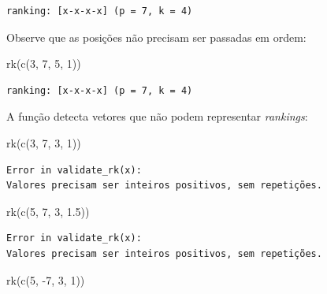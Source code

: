 \documentclass[
  letterpaper,
  DIV=11,
  numbers=noendperiod]{scrreprt}
\newenvironment{Shaded}{\begin{snugshade}}{\end{snugshade}}
\newcommand{\DecValTok}[1]{\textcolor[rgb]{0.68,0.00,0.00}{#1}}
\newcommand{\FloatTok}[1]{\textcolor[rgb]{0.68,0.00,0.00}{#1}}
\newcommand{\FunctionTok}[1]{\textcolor[rgb]{0.28,0.35,0.67}{#1}}
\newcommand{\NormalTok}[1]{\textcolor[rgb]{0.00,0.23,0.31}{#1}}
\newcommand{\SpecialCharTok}[1]{\textcolor[rgb]{0.37,0.37,0.37}{#1}}
\begin{document}
\begin{verbatim}
ranking: [x-x-x-x] (p = 7, k = 4)
\end{verbatim}

Observe que as posições não precisam ser passadas em ordem:

\begin{Shaded}
\begin{Highlighting}[]
\FunctionTok{rk}\NormalTok{(}\FunctionTok{c}\NormalTok{(}\DecValTok{3}\NormalTok{, }\DecValTok{7}\NormalTok{, }\DecValTok{5}\NormalTok{, }\DecValTok{1}\NormalTok{))}
\end{Highlighting}
\end{Shaded}

\begin{verbatim}
ranking: [x-x-x-x] (p = 7, k = 4)
\end{verbatim}

A função detecta vetores que não podem representar \emph{rankings}:

\begin{Shaded}
\begin{Highlighting}[]
\FunctionTok{rk}\NormalTok{(}\FunctionTok{c}\NormalTok{(}\DecValTok{3}\NormalTok{, }\DecValTok{7}\NormalTok{, }\DecValTok{3}\NormalTok{, }\DecValTok{1}\NormalTok{))}
\end{Highlighting}
\end{Shaded}

\begin{verbatim}
Error in validate_rk(x): 
Valores precisam ser inteiros positivos, sem repetições.
\end{verbatim}

\begin{Shaded}
\begin{Highlighting}[]
\FunctionTok{rk}\NormalTok{(}\FunctionTok{c}\NormalTok{(}\DecValTok{5}\NormalTok{, }\DecValTok{7}\NormalTok{, }\DecValTok{3}\NormalTok{, }\FloatTok{1.5}\NormalTok{))}
\end{Highlighting}
\end{Shaded}

\begin{verbatim}
Error in validate_rk(x): 
Valores precisam ser inteiros positivos, sem repetições.
\end{verbatim}

\begin{Shaded}
\begin{Highlighting}[]
\FunctionTok{rk}\NormalTok{(}\FunctionTok{c}\NormalTok{(}\DecValTok{5}\NormalTok{, }\SpecialCharTok{{-}}\DecValTok{7}\NormalTok{, }\DecValTok{3}\NormalTok{, }\DecValTok{1}\NormalTok{))}
\end{Highlighting}
\end{Shaded}
\end{document}
